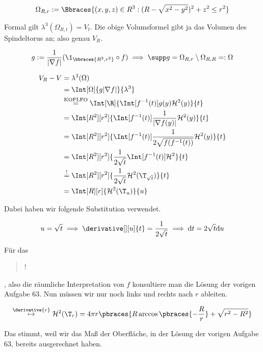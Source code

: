 \begin{solution}

\begin{align*}
    \Omega_{R, r}
    :=
    \Bbraces
    {
        (x, y, z) \in R^3:
        (R - \sqrt{x^2 - y^2})^2 + z^2 \leq r^2
    }
\end{align*}

Formal gilt $\lambda^3(\Omega_{R, t}) = V_t$.
Die obige Volumsformel gibt ja das Volumen des Spindeltorus an; also genau $V_R$.

\begin{align*}
    g := \frac{1}{|\nabla f|} (\1_\bbraces{R^2, r^2} \circ f)
    \implies
    \supp g = \Omega_{R, r} \setminus \Omega_{R, R} =: \Omega
\end{align*}

\begin{align*}
    V_R - V
    & =
    \lambda^3(\Omega) \\
    & =
    \Int[\Omega]
    {
        g |\nabla f|
    }{\lambda^3} \\
    & \stackrel
    {
        \text{KOFLFO}
    }{=}
    \Int[\R]
    {
        \Int[f^{-1}(t)]
        {
            g(y)
        }{\mathcal{H}^2(y)}
    }{t} \\
    & =
    \Int[R^2][r^2]
    {
        \Int[f^{-1}(t)]
        {
            \frac{1}{|\nabla f(y)|}
        }{\mathcal{H}^2(y)}
    }{t} \\
    & =
    \Int[R^2][r^2]
    {
        \Int[f^{-1}(t)]
        {
            \frac{1}{2 \sqrt{f(f^{-1}(t))}}
        }{\mathcal{H}^2(y)}
    }{t} \\
    & =
    \Int[R^2][r^2]
    {
        \frac{1}{2 \sqrt t}
        \Int[f^{-1}(t)]{}{\mathcal{H}^2}
    }{t} \\
    & \stackrel{!}{=}
    \Int[R^2][r^2]
    {
        \frac{1}{2 \sqrt t}
        \mathcal{H}^2(\T_{\sqrt{t}})
    }{t} \\
    & =
    \Int[R][r]
    {
        \mathcal{H}^2(\T_u)
    }{u}
\end{align*}

Dabei haben wir folgende Substitution verwendet.

\begin{align*}
    u = \sqrt t
    \implies
    \derivative[][u]{t} = \frac{1}{2 \sqrt t} \implies \mathrm{d} t = 2 \sqrt t \mathrm{d} u
\end{align*}

Für das \blockquote{!}, also die räumliche Interpretation von $f$ konsultiere man die Lösung der vorigen Aufgabe 63.
Nun müssen wir nur noch links und rechts nach $r$ ableiten.

\begin{align*}
    \stackrel
    {
        \derivative{r}
    }{\mapsto}
    \mathcal{H}^2(\T_r)
    =
    4 \pi r
    \pbraces
    {
        R
        \arccos \pbraces{-\frac{R}{r}}
        +
        \sqrt{r^2 - R^2}
    }
\end{align*}

Das stimmt, weil wir das Maß der Oberfläche, in der Lösung der vorigen Aufgabe 63, bereits ausgerechnet haben.

\end{solution}

